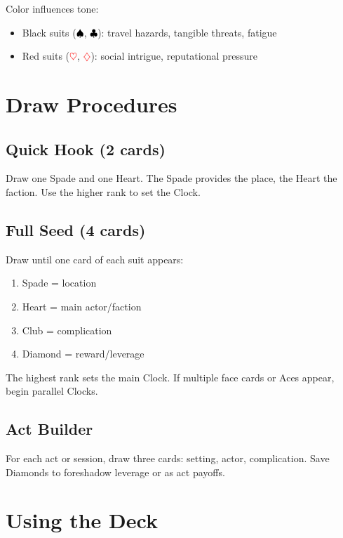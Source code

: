 Color influences tone:
\begin{itemize}
\item Black suits (\textcolor{black}{$\spadesuit$}, \textcolor{black}{$\clubsuit$}): travel hazards, tangible threats, fatigue
\item Red suits (\textcolor{red}{$\heartsuit$}, \textcolor{red}{$\diamondsuit$}): social intrigue, reputational pressure
\end{itemize}

\section{Draw Procedures}

\subsection{Quick Hook (2 cards)}
Draw one Spade and one Heart. The Spade provides the place, the Heart the faction. Use the higher rank to set the Clock.

\subsection{Full Seed (4 cards)}
Draw until one card of each suit appears:
\begin{enumerate}
\item Spade = location
\item Heart = main actor/faction
\item Club = complication
\item Diamond = reward/leverage
\end{enumerate}

The highest rank sets the main Clock. If multiple face cards or Aces appear, begin parallel Clocks.

\subsection{Act Builder}
For each act or session, draw three cards: setting, actor, complication. Save Diamonds to foreshadow leverage or as act payoffs.

\section{Using the Deck}

